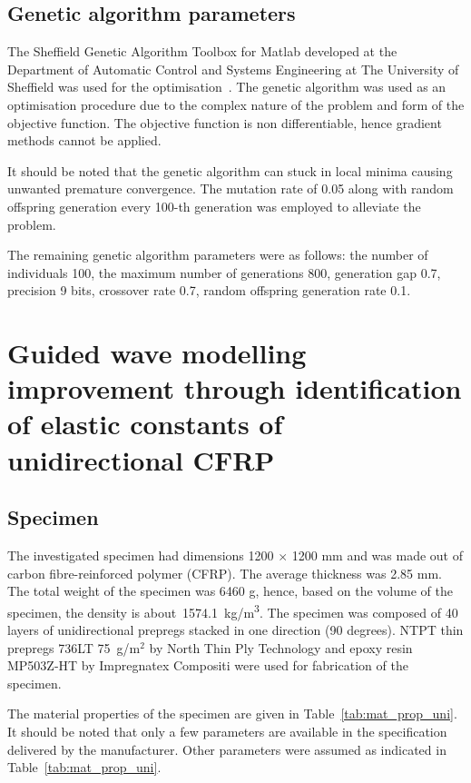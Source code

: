 \documentclass[preprint,12pt]{elsarticle}
\begin{document}
\subsection{Genetic algorithm parameters}
The Sheffield Genetic Algorithm Toolbox for Matlab developed at the Department of Automatic Control and Systems Engineering at The University of Sheffield was used for the optimisation~\cite{Chipperfield1994}.
The genetic algorithm was used as an optimisation procedure due to the complex nature of the problem and form of the objective function. 
The objective function is non differentiable, hence gradient methods cannot be applied. 

It should be noted that the genetic algorithm can stuck in local minima causing unwanted premature convergence. 
The mutation rate of 0.05 along with random offspring generation every 100-th generation was employed to alleviate the problem.

The remaining genetic algorithm parameters were as follows: the number of individuals 100, the maximum number of generations 800, generation gap 0.7, precision 9 bits, crossover rate 0.7,  random offspring generation rate 0.1.
\section{Guided wave modelling improvement through identification of elastic constants of unidirectional CFRP \label{sec:modelling_improvement}} 
\subsection{Specimen}
The investigated specimen had dimensions 1200 $\times$ 1200 mm and was made out of carbon fibre-reinforced polymer (CFRP). 
The average thickness was 2.85 mm.
The total weight of the specimen was 6460 g, hence, based on the volume of the specimen, the density is about~1574.1~kg/m\textsuperscript{3}.
The specimen was composed of 40 layers of unidirectional prepregs stacked in one direction (90 degrees). 
NTPT thin prepregs 736LT 75~g/m$^2$ by North Thin Ply Technology and epoxy resin MP503Z-HT by Impregnatex Compositi were used for fabrication of the specimen.

The material properties of the specimen are given in Table~\ref{tab:mat_prop_uni}. 
It should be noted that only a few parameters are available in the specification delivered by the manufacturer. 
Other parameters were assumed as indicated in Table~\ref{tab:mat_prop_uni}.
\end{document}
